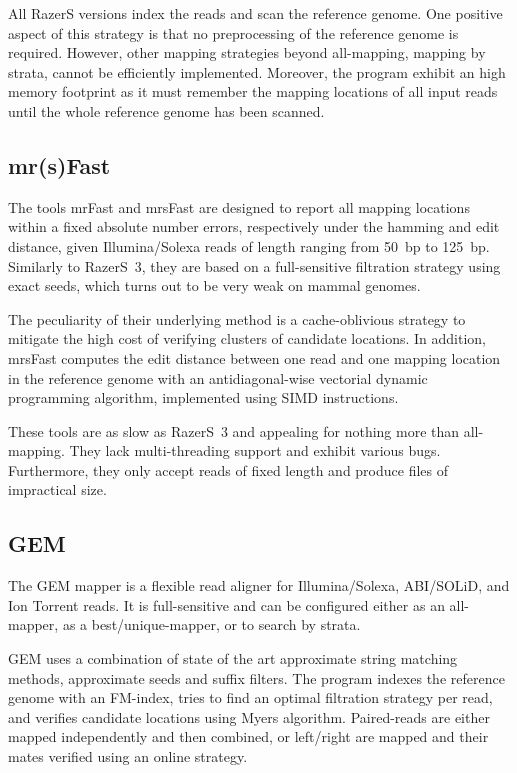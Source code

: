All RazerS versions index the reads and scan the reference genome.
One positive aspect of this strategy is that no preprocessing of the reference genome is required.
However, other mapping strategies beyond all-mapping, \eg mapping by strata, cannot be efficiently implemented.
Moreover, the program exhibit an high memory footprint as it must remember the mapping locations of all input reads until the whole reference genome has been scanned.


\subsection{mr(s)Fast}

The tools mrFast \citep{Ahmadi2011} and mrsFast \citep{Hach2010} are designed to report all mapping locations within a fixed absolute number errors, respectively under the hamming and edit distance, given Illumina/Solexa reads of length ranging from 50~bp to 125~bp.
Similarly to RazerS~3, they are based on a full-sensitive filtration strategy using exact seeds, which turns out to be very weak on mammal genomes.

The peculiarity of their underlying method is a cache-oblivious strategy to mitigate the high cost of verifying clusters of candidate locations.
In addition, mrsFast computes the edit distance between one read and one mapping location in the reference genome with an antidiagonal-wise vectorial dynamic programming algorithm, implemented using SIMD instructions.

These tools are as slow as RazerS~3 and appealing for nothing more than all-mapping.
They lack multi-threading support and exhibit various bugs.
Furthermore, they only accept reads of fixed length and produce files of impractical size.


\subsection{GEM}

The GEM mapper \citep{Gem} is a flexible read aligner for Illumina/Solexa, ABI/SOLiD, and Ion Torrent reads.
It is full-sensitive and can be configured either as an all-mapper, as a best/unique-mapper, or to search by strata.

GEM uses a combination of state of the art approximate string matching methods, \eg approximate seeds and suffix filters.
The program indexes the reference genome with an FM-index, tries to find an optimal filtration strategy per read, and verifies candidate locations using Myers algorithm.
Paired-reads are either mapped independently and then combined, or left/right are mapped and their mates verified using an online strategy.

